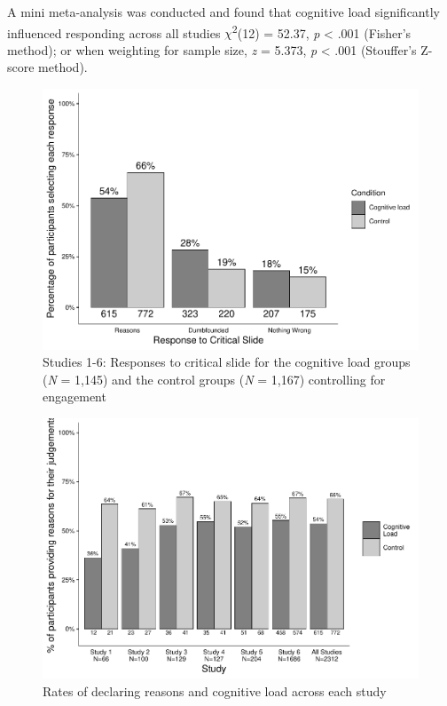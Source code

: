 \documentclass[
  american,
  man,floatsintext]{apa7}
\begin{document}
A mini meta-analysis was conducted and found that cognitive load significantly influenced responding across all studies \(\chi\)\textsuperscript{2}(12) = 52.37, \emph{p} \textless{} .001 (Fisher's method); or when weighting for sample size, \emph{z} = 5.373, \emph{p} \textless{} .001 (Stouffer's Z-score method).

\begin{figure}
\centering
\includegraphics{cog_load_in_chunks_files/figure-latex/ch5Sallfig2criticalcondition-1.pdf}
\caption{\label{fig:ch5Sallfig2criticalcondition}Studies 1-6: Responses to critical slide for the cognitive load groups (\emph{N} = 1,145) and the control groups (\emph{N} = 1,167) controlling for engagement}
\end{figure}

\newpage

\begin{figure}
\centering
\includegraphics{cog_load_in_chunks_files/figure-latex/ch5figall-1.pdf}
\caption{\label{fig:ch5figall}Rates of declaring reasons and cognitive load across each study}
\end{figure}
\end{document}
